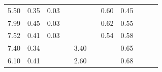 \documentclass[10pt,a4paper]{article}
\begin{document}
\begin{table}
\begin{tabular}{@{}ccccccccccc@{}}
		5.50                                                         & 0.35                                                & 0.03                                                &                                                     &                                                     &                                                      & 0.60                                                & 0.45                                                  &                                                         &                                                      & \cite{ADAS}            \\
		7.99                                                         & 0.45                                                & 0.03                                                &                                                     &                                                     &                                                      & 0.62                                                & 0.55                                                  &                                                         &                                                      & \cite{ADAS}            \\
		7.52                                                         & 0.41                                                & 0.03                                                &                                                     &                                                     &                                                      & 0.54                                                & 0.58                                                  &                                                         &                                                      & \cite{ADAS}            \\
		7.40                                                         & 0.34                                                &                                                     &                                                     & 3.40                                                &                                                      &                                                     & 0.65                                                  &                                                         &                                                      & \cite{Risgberg}                               \\
		6.10                                                         & 0.41                                                &                                                     &                                                     & 2.60                                                &                                                      &                                                     & 0.68                                                  &                                                         &                                                      & \cite{Risgberg}                                \\

\end{tabular}
\end{table}
\end{document}
